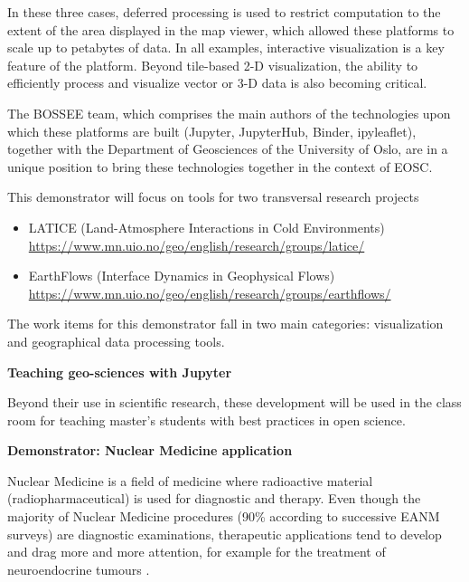 In these three cases, deferred processing is used to restrict computation to
the extent of the area displayed in the map viewer, which allowed these
platforms to scale up to petabytes of data. In all examples, interactive
visualization is a key feature of the platform. Beyond tile-based
2-D visualization, the ability to efficiently process and visualize vector
or 3-D  data is also becoming critical.

The BOSSEE team, which comprises the main authors of the technologies upon
which these platforms are built (Jupyter, JupyterHub, Binder, ipyleaflet),
together with the Department of Geosciences of the University of Oslo, are
in a unique position to bring these technologies together in the context of
EOSC.

This demonstrator will focus on tools for two transversal research projects

\begin{itemize}
\item LATICE (Land-Atmosphere Interactions in Cold Environments)
\url{https://www.mn.uio.no/geo/english/research/groups/latice/}
\item EarthFlows (Interface Dynamics in Geophysical Flows)
\url{https://www.mn.uio.no/geo/english/research/groups/earthflows/}
\end{itemize}

The work items for this demonstrator fall in two main categories:
visualization and geographical data processing tools.

\textbf{Teaching geo-sciences with Jupyter}

Beyond their use in scientific research, these development will be used in
the class room for teaching master's students with best practices in open
science.


\medskip
\textbf{Demonstrator: Nuclear Medicine application}

  Nuclear Medicine is a field of medicine where radioactive material
  (radiopharmaceutical) is used for diagnostic and therapy. Even though the
  majority of Nuclear Medicine procedures (90\% according to successive EANM
  surveys) are diagnostic examinations, therapeutic applications tend to
  develop and drag more and more attention, for example for the treatment of
  neuroendocrine tumours \cite{Bodei2009}.

